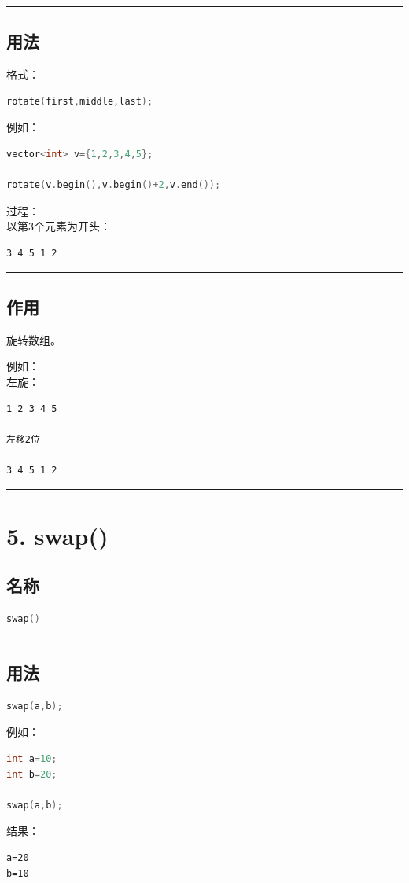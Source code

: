 \documentclass[9pt,twocolumn]{extarticle}
\begin{document}
\noindent\rule{\linewidth}{0.4pt}

\subsection{用法}
格式：
\begin{lstlisting}[language=C++]
rotate(first,middle,last);
\end{lstlisting}
例如：
\begin{lstlisting}[language=C++]
vector<int> v={1,2,3,4,5};

rotate(v.begin(),v.begin()+2,v.end());
\end{lstlisting}
过程：\\
以第3个元素为开头：
\begin{lstlisting}
3 4 5 1 2
\end{lstlisting}

\noindent\rule{\linewidth}{0.4pt}

\subsection{作用}
旋转数组。

例如：\\
左旋：
\begin{lstlisting}
1 2 3 4 5

左移2位

3 4 5 1 2
\end{lstlisting}

\noindent\rule{\linewidth}{0.4pt}

\section{5. swap()}

\subsection{名称}
\begin{lstlisting}[language=C++]
swap()
\end{lstlisting}

\noindent\rule{\linewidth}{0.4pt}

\subsection{用法}
\begin{lstlisting}[language=C++]
swap(a,b);
\end{lstlisting}
例如：
\begin{lstlisting}[language=C++]
int a=10;
int b=20;

swap(a,b);
\end{lstlisting}
结果：
\begin{lstlisting}
a=20
b=10
\end{lstlisting}
\end{document}

